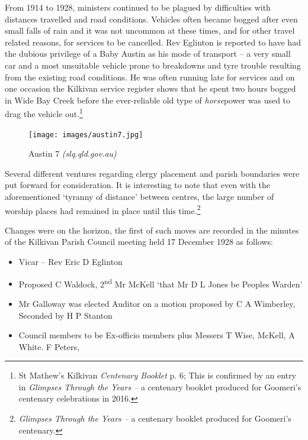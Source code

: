 From 1914 to 1928, ministers continued to be plagued by difficulties
with distances travelled and road conditions. Vehicles often became
bogged after even small falls of rain and it was not uncommon at these
times, and for other travel related reasons, for services to be
cancelled. Rev Eglinton is reported to have had the dubious privilege of
a Baby Austin as his mode of transport -- a very small car and a most
unsuitable vehicle prone to breakdowns and tyre trouble resulting from
the existing road conditions. He was often running late for services and
on one occasion the Kilkivan service register shows that he spent two
hours bogged in Wide Bay Creek before the ever-reliable old type of
\emph{horse}power was used to drag the vehicle out.\footnote{St Mathew's
  Kilkivan \emph{Centenary Booklet} p. 6; This is confirmed by an entry
  in \emph{Glimpses Through the Years --} a centenary booklet produced
  for Goomeri's centenary celebrations in 2016.}




\begin{figure}[!h]
\begin{center}
\texttt{[image: images/austin7.jpg]}
\caption{Austin 7 \emph{(slq.qld.gov.au)}}
\end{center}
\end{figure}


Several different ventures regarding clergy placement and parish
boundaries were put forward for consideration. It is interesting to note
that even with the aforementioned `tyranny of distance' between centres,
the large number of worship places had remained in place until this
time.\footnote{\emph{Glimpses Through the Years --} a centenary booklet
  produced for Goomeri's centenary.}

Changes were on the horizon, the first of such moves are recorded in the
minutes of the Kilkivan Parish Council meeting held 17 December 1928 as
follows:

\begin{itemize}
\item
  Vicar -- Rev Eric D Eglinton
\item
  Proposed C Waldock, 2\textsuperscript{nd} Mr McKell `that Mr D L Jones
  be Peoples Warden'
\item
  Mr Galloway was elected Auditor on a motion proposed by C A Wimberley,
  Seconded by H P Stanton
\item
  Council members to be Ex-officio members plus Messers T Wise, McKell,
  A White. F Peters,
\end{itemize}

